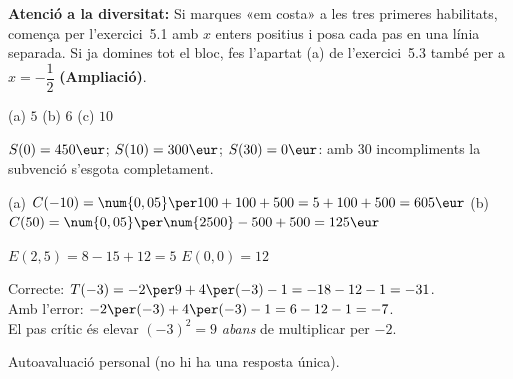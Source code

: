 \begin{exercicis}
\begin{exlist}
\textbf{Atenció a la diversitat:} Si marques «em costa» a les tres primeres
habilitats, comença per l'exercici~5.1 amb $x$ enters positius i posa cada
pas en una línia separada. Si ja domines tot el bloc, fes l'apartat (a)
de l'exercici~5.3 també per a $x = -\dfrac{1}{2}$ \textbf{(Ampliació)}.
\end{exlist}
\end{exercicis}

\begin{solucions}
\begin{sollist}
  \item (a) $5$ \quad (b) $6$ \quad (c) $10$
  \item $S(0)=450\eur$; \; $S(10)=300\eur$; \; $S(30)=0\eur$:
        amb 30 incompliments la subvenció s'esgota completament.
  \item (a) $C(-10) = \num{0,05}\per 100 + 100 + 500 = 5+100+500 = 605\eur$
        \quad (b) $C(50) = \num{0,05}\per\num{2500} - 500 + 500 = 125\eur$
  \item $E(2,5) = 8-15+12 = 5$ \quad $E(0,0) = 12$
  \item Correcte: $T(-3) = -2\per 9 + 4\per(-3)-1 = -18-12-1 = -31$. \\
        Amb l'error: $-2\per(-3)+4\per(-3)-1 = 6-12-1 = -7$. \\
        El pas crític és elevar $(-3)^2=9$ \emph{abans} de multiplicar per $-2$.
  \item Autoavaluació personal (no hi ha una resposta única).
\end{sollist}
\end{solucions}
